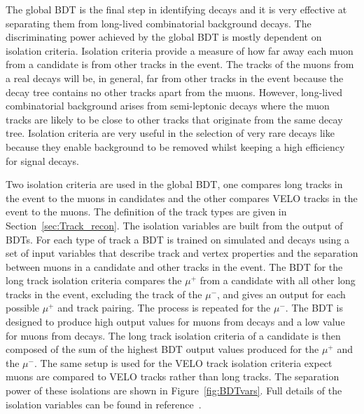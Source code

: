The global BDT is the final step in identifying \bmumu decays and it is very effective at separating them from long-lived combinatorial background decays. The discriminating power achieved by the global BDT is mostly dependent on isolation criteria. Isolation criteria provide a measure of how far away each muon from a \bmumu candidate is from other tracks in the event. The tracks of the muons from a real \bmumu decays will be, in general, far from other tracks in the event because the \bmumu decay tree contains no other tracks apart from the muons. However, long-lived combinatorial background arises from semi-leptonic decays where the muon tracks are likely to be close to other tracks that originate from the same decay tree. %
Isolation criteria are very useful in the selection of very rare decays like \bsmumu because they enable background to be removed whilst keeping a high efficiency for signal decays.

Two isolation criteria are used in the global BDT, one compares long tracks in the event to the muons in \bmumu candidates and the other compares VELO tracks in the event to the muons. The definition of the track types are given in Section~\ref{sec:Track_recon}. The isolation variables are built from the output of BDTs. For each type of track a BDT is trained on simulated \bsmumu and \bbbarmumux decays using a set of input variables that describe track and vertex properties and the separation between muons in a \bsmumu candidate and other tracks in the event. 
The BDT for the long track isolation criteria compares the $\mu^{+}$ from a \bsmumu candidate with all other long tracks in the event, excluding the track of the $\mu^{-}$, and gives an output for each possible $\mu^{+}$ and track pairing. The process is repeated for the $\mu^{-}$. The BDT is designed to produce high output values for muons from \bbbarmumux decays and a low value for muons from \bsmumu decays. The long track isolation criteria of a \bsmumu candidate is then composed of the sum of the highest BDT output values produced for the $\mu^{+}$ and the $\mu^{-}$. The same setup is used for the VELO track isolation criteria expect muons are compared to VELO tracks rather than long tracks. The separation power of these isolations are shown in Figure~\ref{fig:BDTvars}. Full details of the isolation variables can be found in reference~\cite{Archilli:1970886}.



